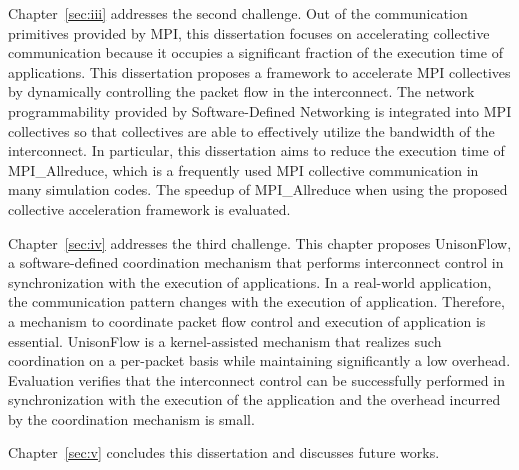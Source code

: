Chapter~\ref{sec:iii} addresses the second challenge. Out of the communication
primitives provided by MPI, this dissertation focuses on accelerating
collective communication because it occupies a significant fraction of the
execution time of applications. This dissertation proposes a framework to
accelerate MPI collectives by dynamically controlling the packet flow in the
interconnect. The network programmability provided by Software-Defined
Networking is integrated into MPI collectives so that collectives are able to
effectively utilize the bandwidth of the interconnect. In particular, this
dissertation aims to reduce the execution time of MPI\_Allreduce, which is a
frequently used MPI collective communication in many simulation codes. The
speedup of MPI\_Allreduce when using the proposed collective acceleration
framework is evaluated.

Chapter~\ref{sec:iv} addresses the third challenge. This chapter proposes
UnisonFlow, a software-defined coordination mechanism that performs
interconnect control in synchronization with the execution of applications.
In a real-world application, the communication pattern changes with the
execution of application. Therefore, a mechanism to coordinate packet flow
control and execution of application is essential. UnisonFlow is a
kernel-assisted mechanism that realizes such coordination on a per-packet
basis while maintaining significantly a low overhead. Evaluation verifies that
the interconnect control can be successfully performed in synchronization with
the execution of the application and the overhead incurred by the coordination
mechanism is small.

Chapter~\ref{sec:v} concludes this dissertation and discusses future works.
